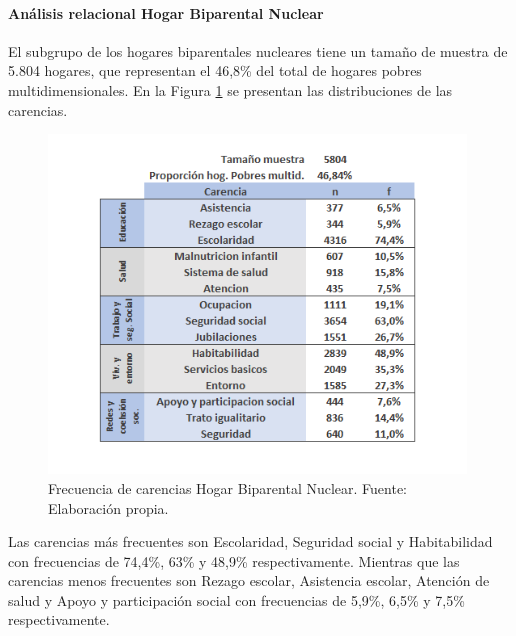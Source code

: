 \documentclass[12pt,letterpaper,spanish]{article}
\begin{document}
\paragraph{Análisis relacional Hogar Biparental Nuclear}
El subgrupo de los hogares biparentales nucleares tiene un tamaño de muestra de 5.804 hogares, que representan el 46,8\% del total de hogares pobres multidimensionales. En la Figura \ref{freBinuc} se presentan las distribuciones de las carencias.
\begin{figure}[H]
  \centering
    \includegraphics[height=9cm]{HOGARES/tabla_binuc.png}
    \caption{Frecuencia de carencias Hogar Biparental Nuclear. Fuente: Elaboración propia.}
    \label{freBinuc}
\end{figure}
Las carencias más frecuentes son Escolaridad, Seguridad social y Habitabilidad con frecuencias de 74,4\%, 63\% y 48,9\% respectivamente. Mientras que las carencias menos frecuentes son Rezago escolar, Asistencia escolar, Atención de salud y Apoyo y participación social con frecuencias de 5,9\%, 6,5\% y 7,5\% respectivamente.
\end{document}
